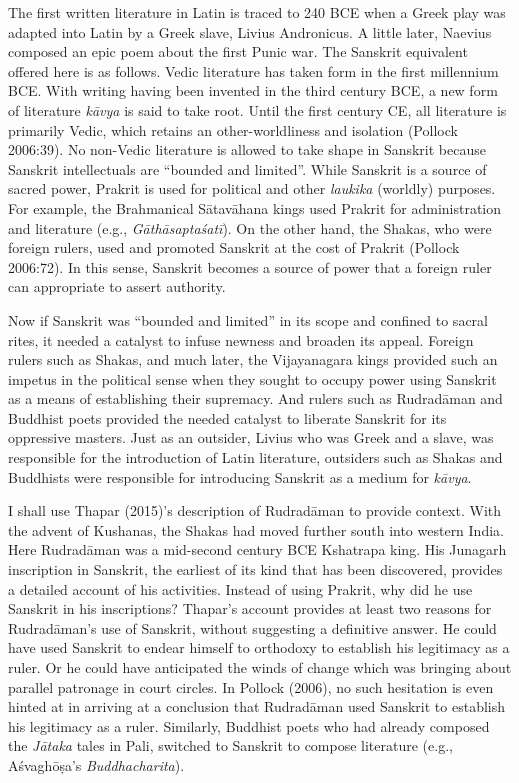 The first written literature in Latin is traced to 240 BCE when a Greek play was adapted into Latin by a Greek slave, Livius Andronicus. A little later, Naevius
 composed an epic poem about the first Punic war. The Sanskrit equivalent offered here is as follows. Vedic literature has taken form in the first millennium BCE. With writing having been invented in the third century BCE, a new form of literature {\sl kāvya} is said to take root. Until the first century CE, all literature is primarily Vedic, which retains an other-worldliness and isolation (Pollock 2006:39). No non-Vedic literature is allowed to take shape in Sanskrit because Sanskrit intellectuals are “bounded and limited”. While Sanskrit is a source of sacred power, Prakrit is used for political and other {\sl laukika} (worldly) purposes. For example, the Brahmanical Sātavāhana kings used Prakrit for administration and literature (e.g., {\sl Gāthāsaptaśatī}). On the other hand, the Shakas, who were foreign rulers, used and promoted Sanskrit at the cost of Prakrit (Pollock 2006:72). In this sense, Sanskrit becomes a source of power that a foreign ruler can appropriate to assert authority.

Now if Sanskrit was “bounded and limited” in its scope and confined to sacral rites, it needed a catalyst to infuse newness and broaden its appeal. Foreign rulers such as Shakas, and much later, the Vijayanagara kings provided such an impetus in the political sense when they sought to occupy power using Sanskrit as a means of establishing their supremacy. And rulers such as Rudradāman and Buddhist poets provided the needed catalyst to liberate Sanskrit for its oppressive masters. Just as an outsider, Livius who was Greek and a slave, was responsible for the introduction of Latin literature, outsiders such as Shakas and Buddhists were responsible for introducing Sanskrit as a medium for {\sl kāvya}.

I shall use Thapar (2015)’s description of Rudradāman to provide context. With the advent of Kushanas, the Shakas had moved further south into western India. Here Rudradāman was a mid-second century BCE Kshatrapa king. His Junagarh inscription in Sanskrit, the earliest of its kind that has been discovered, provides a detailed account of his activities. Instead of using Prakrit, why did he use Sanskrit in his inscriptions? Thapar’s account provides at least two reasons for Rudradāman’s use of Sanskrit, without suggesting a definitive answer. He could have used Sanskrit to endear himself to orthodoxy to establish his legitimacy as a ruler. Or he could have anticipated the winds of change which was bringing about parallel patronage in court circles. In Pollock (2006), no such hesitation is even hinted at in arriving at a conclusion that Rudradāman used Sanskrit to establish his legitimacy as a ruler. Similarly, Buddhist poets who had already composed the {\sl Jātaka} tales in Pali, switched to Sanskrit to compose literature (e.g., Aśvaghōṣa’s {\sl Buddhacharita}). 

